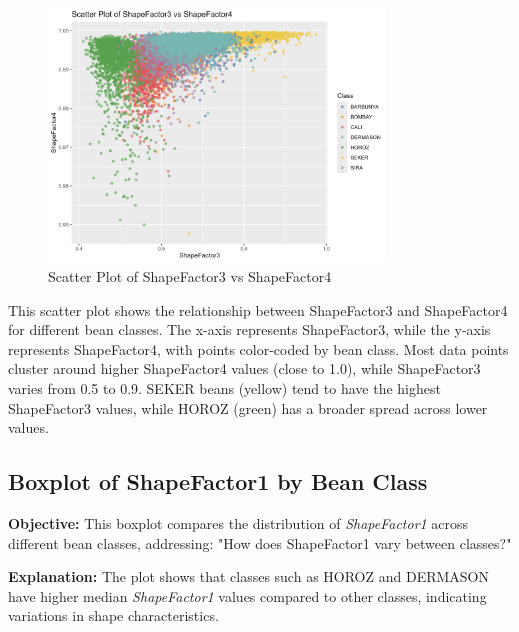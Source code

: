\documentclass[a4paper,12pt]{article}
\begin{document}
\begin{figure}[H]
    \centering
    \includegraphics[width=0.8\textwidth]{graphs/scatter_shapefactor3_shapefactor4.png}
    \caption{Scatter Plot of ShapeFactor3 vs ShapeFactor4}
    \label{fig:scatter_shape3_shape4}
\end{figure}
This scatter plot shows the relationship between ShapeFactor3 and ShapeFactor4 for different bean classes. The x-axis represents ShapeFactor3, while the y-axis represents ShapeFactor4, with points color-coded by bean class. Most data points cluster around higher ShapeFactor4 values (close to 1.0), while ShapeFactor3 varies from 0.5 to 0.9. SEKER beans (yellow) tend to have the highest ShapeFactor3 values, while HOROZ (green) has a broader spread across lower values. 

\newpage

\subsection{Boxplot of ShapeFactor1 by Bean Class}
\noindent\textbf{Objective:} This boxplot compares the distribution of \textit{ShapeFactor1} across different bean classes, addressing: "How does ShapeFactor1 vary between classes?"

\noindent\textbf{Explanation:} The plot shows that classes such as HOROZ and DERMASON have higher median \textit{ShapeFactor1} values compared to other classes, indicating variations in shape characteristics.
\end{document}
